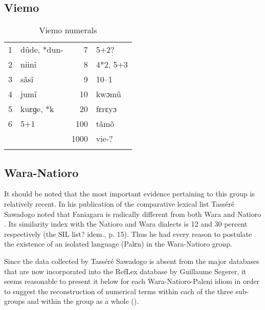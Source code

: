 \subsection{Viemo}%
\begin{table}
\caption{\label{tab:3:186}Viemo numerals}


\begin{tabularx}{\textwidth}{lQrQ}
\lsptoprule

1 & d{\~{u}}de, *dun- & 7 & 5+2?\\
2 & niin{\~{i}} & 8 & 4*2, 5+3\\
3 & s{\~{a}}s{\~{i}} & 9 & 10--1\\
4 & jum{\~{i}} & 10 & kwɔm{\~{u}}\\
5 & kuɛɡe, *k{} & 20 & fɛrɛyɔ\\
6 & 5+1 & 100 & t{\~{a}}m{\~{o}}\\
&  & 1000 & vie-?\\
\lspbottomrule
\end{tabularx}
\end{table}
 
\subsection{Wara-Natioro}%
It should be noted that the most important evidence pertaining to this group is relatively recent. In his publication of the comparative lexical list Tasséré Sawadogo noted that Faniagara is radically different from both Wara and Natioro \citep{Sawadogo2002}. Its similarity index with the Natioro and Wara dialects is 12 and 30 percent respectively (the SIL list? idem., p. 15). Thus he had every reason to postulate the existence of an isolated language (Palɛn) in the Wara-Natioro group. 

Since the data collected by Tasséré Sawadogo is absent from the major databases that are now incorporated into the RefLex database by Guillaume Segerer, it seems reasonable to present it below for each Wara-Natioro-Paleni idiom in order to suggest the reconstruction of numerical terms within each of the three sub-groups and within the group as a whole ().

